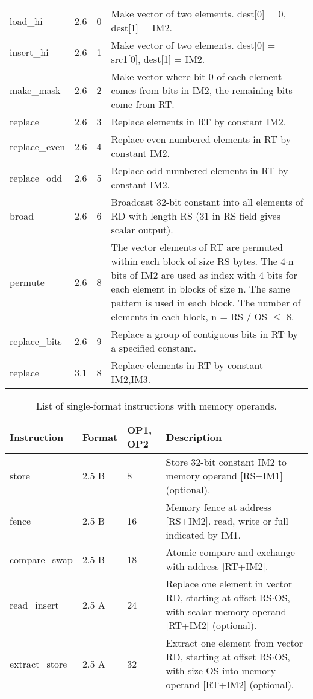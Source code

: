 \documentclass[forwardcom.tex]{subfiles}
\begin{document}
\begin{longtable} {|p{20mm}|p{10mm}|p{8mm}|p{75mm}|}
load\_hi      & 2.6 & 0 & Make vector of two elements. dest[0] = 0, dest[1] = IM2. \\
insert\_hi    & 2.6 & 1 & Make vector of two elements. dest[0] = src1[0], dest[1] = IM2. \\
make\_mask    & 2.6 & 2 & Make vector where bit 0 of each element comes from bits in IM2, the remaining bits come from RT. \\
replace       & 2.6 & 3 & Replace elements in RT by constant IM2. \\
replace\_even & 2.6 & 4 & Replace even-numbered elements in RT by constant
IM2. \\
replace\_odd  & 2.6 & 5 & Replace odd-numbered elements in RT by constant
IM2. \\
broad         & 2.6 & 6 & Broadcast 32-bit constant into all elements of RD with length RS (31 in RS field gives scalar output). \\
permute       & 2.6 & 8 & The vector elements of RT are permuted within each block of size RS bytes. The 4$\cdot$n bits of IM2 are used as index with 4 bits for
each element in blocks of size n. The same pattern is used in each
block. The number of elements in each block, n = RS / OS $\leq$ 8. \\
replace\_bits & 2.6 &  9  & Replace a group of contiguous bits in RT by a specified constant. \\
replace       & 3.1 & 8 & Replace elements in RT by constant IM2,IM3. \\
\hline
\end{longtable}

\begin{longtable} {|p{20mm}|p{10mm}|p{8mm}|p{75mm}|}
\caption{List of single-format instructions with memory operands.} 
\label{table:ListOfSingleFormatInstructionsMemory} \\
\endfirsthead
\endhead
\hline
\bfseries Instruction & \bfseries Format &\bfseries OP1, OP2 & \bfseries Description \\
\hline
store         & 2.5 B &  8 & Store 32-bit constant IM2 to memory operand [RS+IM1] (optional). \\

fence         & 2.5 B & 16 & Memory fence at address [RS+IM2]. read, write or full indicated by IM1.\\

compare\_swap & 2.5 B & 18 & Atomic compare and exchange with address [RT+IM2].\\

read\_insert  & 2.5 A & 24 & Replace one element in vector RD, starting at offset 
RS$\cdot$OS, with scalar memory operand [RT+IM2] (optional).  \\

extract\_store& 2.5 A & 32 & Extract one element from vector RD, starting at offset RS$\cdot$OS, with size OS into memory operand [RT+IM2] (optional). \\

\hline
\end{longtable}
\vspace{4mm}
\end{document}
